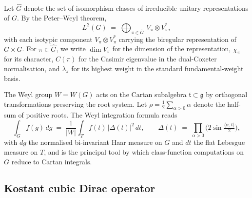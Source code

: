 \documentclass[11pt,a4paper]{article}
\theoremstyle{plain}
\theoremstyle{definition}
\newcommand{\Cas}{C}
\begin{document}
Let $\widehat G$ denote the set of isomorphism classes of irreducible
unitary representations of $G$. By the Peter--Weyl theorem,
\begin{equation}\label{eq:peter_weyl}
   L^2(G) \;=\; \bigoplus_{\pi \in \widehat G}\, V_\pi \otimes V_\pi^*,
\end{equation}
with each isotypic component $V_\pi \otimes V_\pi^*$ carrying the
biregular representation of $G \times G$. For $\pi \in \widehat G$, we
write $\dim V_\pi$ for the dimension of the representation,
$\chi_\pi$ for its character, $\Cas(\pi)$ for the Casimir eigenvalue
in the dual-Coxeter normalisation, and $\lambda_\pi$ for its highest
weight in the standard fundamental-weight basis.

The Weyl group $W = W(G)$ acts on the Cartan subalgebra
$\mathfrak t \subset \mathfrak g$ by orthogonal transformations
preserving the root system. Let $\rho = \frac{1}{2}\sum_{\alpha > 0}
\alpha$ denote the half-sum of positive roots. The Weyl integration
formula reads
\begin{equation}\label{eq:weyl_integration}
   \int_G f(g)\, dg
   \;=\; \frac{1}{|W|}\int_T f(t)\, |\Delta(t)|^2\, dt,
   \qquad
   \Delta(t) \;=\; \prod_{\alpha > 0}\bigl(2 \sin \tfrac{\langle \alpha,
   t \rangle}{2}\bigr),
\end{equation}
with $dg$ the normalised bi-invariant Haar measure on $G$ and $dt$ the
flat Lebesgue measure on $T$, and is the principal tool by which
class-function computations on $G$ reduce to Cartan integrals.

\subsection{Kostant cubic Dirac operator}\label{sec:kostant_dirac}
\end{document}
